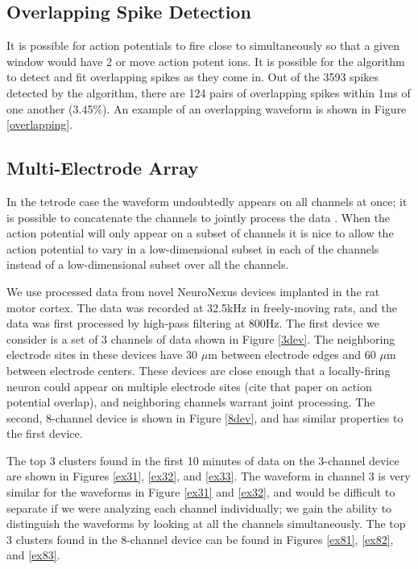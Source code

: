 \subsection{Overlapping Spike Detection}
It is possible for action potentials to fire close to simultaneously so that a given window would have 2 or move action potent ions.  It is possible for the algorithm to detect and fit overlapping spikes as they come in.  Out of the 3593 spikes detected by the algorithm, there are 124 pairs of overlapping spikes within 1ms of one another (3.45\%).  An example of an overlapping waveform is shown in Figure \ref{overlapping}.

\subsection{Multi-Electrode Array}
In the tetrode case the waveform undoubtedly appears on all channels at once; it is possible to concatenate the channels to jointly process the data \cite{wood2009}.  When the action potential will only appear on a subset of channels it is nice to allow the action potential to vary in a low-dimensional subset in each of the channels instead of a low-dimensional subset over all the channels. \cite{Prentice2011}

We use processed data from novel NeuroNexus devices implanted in the rat motor cortex.  The data was recorded at 32.5kHz in freely-moving rats, and the data was first processed by high-pass filtering at 800Hz.  The first device we consider is a set of 3 channels of data shown in Figure \ref{3dev}.  The neighboring electrode sites in these devices have 30 $\mu$m between electrode edges and 60 $\mu$m between electrode centers.  These devices are close enough that a locally-firing neuron could appear on multiple electrode sites (cite that paper on action potential overlap), and neighboring channels warrant joint processing.  The second, 8-channel device is shown in Figure \ref{8dev}, and has similar properties to the first device.

 The top 3 clusters found in the first 10 minutes of data on the 3-channel device are shown in Figures \ref{ex31}, \ref{ex32}, and \ref{ex33}.  The waveform in channel 3 is very similar for the waveforms in Figure \ref{ex31} and \ref{ex32}, and would be difficult to separate if we were analyzing each channel individually; we gain the ability to distinguish the waveforms by looking at all the channels simultaneously.  The top 3 clusters found in the 8-channel device can be found in Figures \ref{ex81}, \ref{ex82}, and \ref{ex83}.

